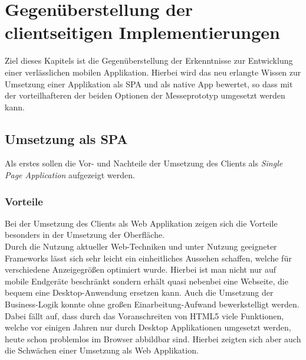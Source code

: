 \chapter{Gegenüberstellung der clientseitigen Implementierungen}
\label{cha:gegenueberstellung}
Ziel dieses Kapitels ist die Gegenüberstellung der Erkenntnisse zur Entwicklung einer verlässlichen mobilen Applikation. Hierbei wird das neu erlangte Wissen zur Umsetzung einer Applikation als SPA und als native App bewertet, so dass mit der vorteilhafteren der beiden Optionen der Messeprototyp umgesetzt werden kann.

\section{Umsetzung als SPA}
\label{sec:gegenueberstellung-SPA}
Als erstes sollen die Vor- und Nachteile der Umsetzung des Clients als \textit{Single Page Application} aufgezeigt werden.

\subsection{Vorteile}
\label{sec:vorteile-SPA}
Bei der Umsetzung des Clients als Web Applikation zeigen sich die Vorteile besonders in der Umsetzung der Oberfläche. \\
Durch die Nutzung aktueller Web-Techniken und unter Nutzung geeigneter Frameworks lässt sich sehr leicht ein einheitliches Aussehen schaffen, welche für verschiedene Anzeigegrößen optimiert wurde. Hierbei ist man nicht nur auf mobile Endgeräte beschränkt sondern erhält quasi nebenbei eine Webseite, die bequem eine Desktop-Anwendung ersetzen kann. Auch die Umsetzung der Business-Logik konnte ohne großen Einarbeitung-Aufwand bewerkstelligt werden. Dabei fällt auf, dass durch das Voranschreiten von HTML5 viele Funktionen, welche vor einigen Jahren nur durch Desktop Applikationen umgesetzt werden, heute schon problemlos im Browser abbildbar sind. Hierbei zeigten sich aber auch die Schwächen einer Umsetzung als Web Applikation. 

